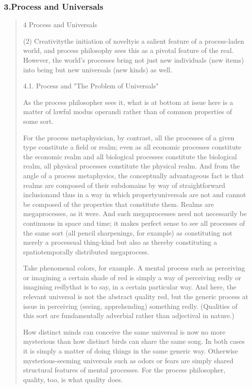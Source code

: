 \documentclass[a4paper]{Thesis}
\begin{document}
\subsubsection{3.Process and Universals}
\begin{quotation}
	4
	Process and Universals	
	
	(2) Creativitythe initiation of noveltyis a salient feature of a process-laden
	world, and process philosophy sees this as a pivotal feature of the real. However, the world's processes bring not
	just new individuals (new items) into being but new universals (new kinds) as well.
	
	4.1. Process and "The Problem of Universals"
	
	As the process philosopher sees it, what
	is at bottom at issue here is a matter of lawful modus operandi rather than of common
	properties of some sort.
	
	For the process metaphysician, by
	contrast, all the processes of a given type constitute a field or realm; even as all
	economic processes constitute the economic realm and all biological processes constitute
	the biological realm, all physical processes constitute the physical realm. And from the
	angle of a process metaphysics, the conceptually advantageous fact is that realms are
	composed of their subdomains by way of straightforward inclusionand thus in a way in
	which propertyuniversals are not and cannot be composed of the properties that
	constitute them. Realms are megaprocesses, as it were. And such megaprocesses need
	not necessarily be continuous in space and time; it makes perfect sense to see all
	processes of the same sort (all pencil sharpenings, for example) as constituting not
	merely a processual thing-kind but also as thereby constituting a spatiotemporally
	distributed megaprocess.
	
	Take phenomenal colors, for example. A mental process such as perceiving or
	imagining a certain shade of red is simply a way of perceiving redly or imagining redlythat
	is to say, in a certain particular way. And here, the relevant universal is not the abstract
	quality red, but the generic process at issue in perceiving (seeing, apprehending)
	something redly. (Qualities of this sort are fundamentally adverbial rather than adjectival
	in nature.)
	
	How distinct minds can conceive the same universal is now no more mysterious than how
	distinct birds can share the same song. In both cases it is simply a matter of doing things
	in the same generic way. Otherwise mysterious-seeming universals such as odors or fears
	are simply shared structural features of mental processes.
	For the process philosopher,
	quality, too, is what quality does.
	

\end{quotation}
\end{document}
